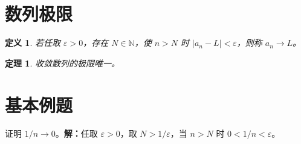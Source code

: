 \documentclass[UTF8,fontset=fandol,11pt]{ctexart}
\newtheorem{definition}{定义}[section]
\newtheorem{theorem}{定理}[section]
\begin{document}
\section{数列极限}
\begin{definition}若任取 $\varepsilon>0$，存在 $N\in\mathbb N$，使 $n>N$ 时 $|a_n-L|<\varepsilon$，则称 $a_n\to L$。\end{definition}
\begin{theorem}收敛数列的极限唯一。\end{theorem}
\section{基本例题}
证明 $1/n\to0$。\textbf{解：}任取 $\varepsilon>0$，取 $N>1/\varepsilon$，当 $n>N$ 时 $0<1/n<\varepsilon$。
\end{document}

